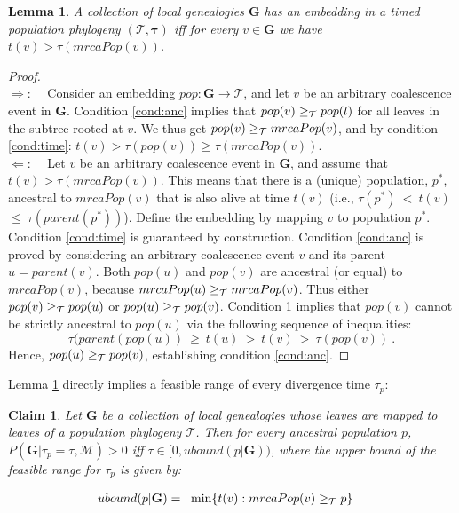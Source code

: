 \documentclass[11pt]{article}
\newcommand{\vect}[1]{\boldsymbol{\mathbf{#1}}}
\newcommand{\M}{\mathcal{M}}
\newcommand{\Tr}{\mathcal{T}}
\newcommand{\G}{\vect{G}}
\newcommand{\1}{\mathbbm{1}}
\newtheorem{claim}{Claim}
\newtheorem{lemma}{Lemma}
\newcommand{\taus}{\vect\tau}
\begin{document}
\begin{lemma}\label{lem:embed}
 A collection of local genealogies $\G$ has an embedding in a timed population phylogeny $(\Tr,\taus)$ iff for every $v\in\G$ we have $t(v) > \tau(mrcaPop(v))$.
\end{lemma}
\begin{proof}
 ~\\
 $\Rightarrow$:~~ Consider an embedding $pop:\G\rightarrow\Tr$, and let $v$ be an arbitrary coalescence event in $\G$.
 Condition \ref{cond:anc} implies that $pop(v)\anc pop(l)$ for all leaves in the subtree rooted at $v$. %
 We thus get $pop(v)\anc mrcaPop(v)$, and by condition \ref{cond:time}: $t(v) > \tau(pop(v)) \geq \tau(mrcaPop(v))$.\\
 $\Leftarrow$:~~ Let $v$ be an arbitrary coalescence event in $\G$, and assume that $t(v) > \tau(mrcaPop(v))$. This means that there is a (unique) population, $p^*$,
 ancestral to $mrcaPop(v)$ that is also alive at time $t(v)$ (i.e., $\tau(p^*) ~<~ t(v)$\\
 $\leq~ \tau(parent(p^*))$). Define the embedding by mapping $v$ to population $p^*$.
 Condition \ref{cond:time} is guaranteed by construction. 
 Condition \ref{cond:anc} is proved by considering an arbitrary coalescence event $v$ and its parent $u=parent(v)$.
 Both $pop(u)$ and $pop(v)$ are ancestral (or equal) to $mrcaPop(v)$, because $mrcaPop(u)\anc mrcaPop(v)$.
 Thus either $pop(v)\anc pop(u)$ or $pop(u)\anc pop(v)$.
 Condition 1  implies that $pop(v)$ cannot be strictly ancestral to $pop(u)$ via the following sequence of inequalities:
 $$\tau(parent(pop(u)) ~\geq~ t(u) ~>~ t(v) ~>~ \tau(pop(v))~.$$
 Hence, $pop(u)\anc pop(v)$, establishing condition \ref{cond:anc}.
\end{proof}

Lemma \ref{lem:embed} directly implies a feasible range of every divergence time $\tau_p$:

\begin{claim}\label{claim:tau_bound_nomig}
 Let $\G$ be a  collection of local genealogies whose leaves are mapped to leaves of a population phylogeny $\Tr$.
 Then for every ancestral population $p$, $P(\G|\tau_p=\tau,\M)>0$ iff $\tau \in [0 , ubound(p|\G) )$, where the upper bound of the feasible range for $\tau_p$
 is given by:
 \begin{small}
 \begin{align}
  ubound(p|\G)   =~~ & \min \{t(v):mrcaPop(v)\anc p\} \label{eq:ubound_nomig}  %
 \end{align}
 \end{small}
\end{claim}
\end{document}
